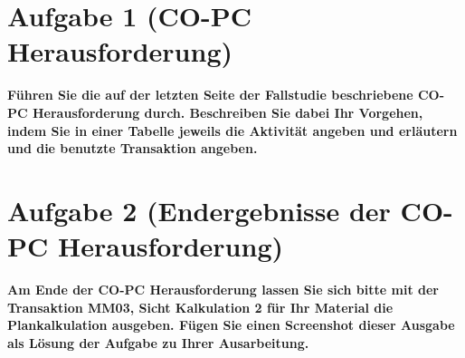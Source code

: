 \section{Aufgabe 1 (CO-PC Herausforderung)}
\textbf{Führen Sie die auf der letzten Seite der Fallstudie beschriebene CO-PC Herausforderung
durch. Beschreiben Sie dabei Ihr Vorgehen, indem Sie in einer Tabelle jeweils die Aktivität
angeben und erläutern und die benutzte Transaktion angeben.}


\clearpage

\section{Aufgabe 2 (Endergebnisse der CO-PC Herausforderung)}
\textbf{Am Ende der CO-PC Herausforderung lassen Sie sich bitte mit der Transaktion MM03, Sicht
Kalkulation 2 für Ihr Material die Plankalkulation ausgeben. Fügen Sie einen Screenshot dieser
Ausgabe als Lösung der Aufgabe zu Ihrer Ausarbeitung.}


\clearpage 